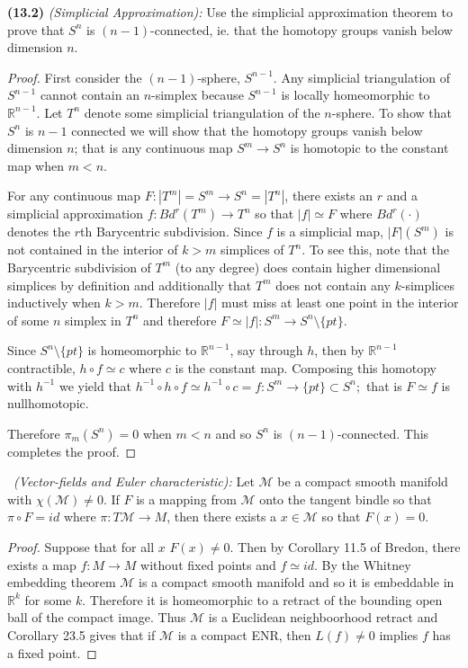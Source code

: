 \documentclass[11pt]{amsart}
\theoremstyle{definition}
\numberwithin{theorem}{section}
\numberwithin{definition}{section}
\numberwithin{equation}{section}
\def\scriptm{{\mathcal M}}
\begin{document}
{\medskip \noindent \textbf{(13.2)} \emph{(Simplicial Approximation):} Use the simplicial approximation theorem to prove that $S^{n}$ is $(n-1)$-connected, ie. that the homotopy groups vanish below dimension $n$.

\begin{proof}
	First consider the $(n-1)$-sphere, $S^{n-1}$. Any simplicial triangulation of $S^{n-1}$ cannot contain an $n$-simplex because $S^{n-1}$ is locally homeomorphic to $\mathbb{R}^{n-1}$. Let $T^{n}$ denote some simplicial triangulation of the $n$-sphere. To show that $S^n$ is $n-1$ connected we will show that the homotopy groups vanish below dimension $n$; that is any continuous map $S^{m} \to S^n$ is homotopic to the constant map when $m < n$. 

	For any continuous map $F: |T^m| = S^m\to S^n = |T^n|$, there exists an $r$ and a simplicial approximation $f: Bd^{r}(T^m) \to T^n$ so that $|f| \simeq F$ where $Bd^r(\cdot)$ denotes the $r$th Barycentric subdivision. Since $f$ is a simplicial map, $|F|(S^m)$ is not contained in the interior of $k > m$ simplices of $T^n$. To see this, note that
	the Barycentric subdivision of $T^m$ (to any degree) does contain higher dimensional simplices by definition and additionally that $T^m$ does not contain any $k$-simplices inductively when $k > m.$ Therefore $|f|$ must miss at least one point in the interior of some $n$ simplex in $T^n$ and therefore $F \simeq |f|:S^m \to S^n \setminus \{pt\}$.

	Since $S^n \setminus \{pt\}$ is homeomorphic to $\mathbb{R}^{n-1}$, say through $h$, then by $\mathbb{R}^{n-1}$ contractible, $h \circ f \simeq c$ where $c$ is the constant map. Composing this homotopy with $h^{-1}$ we yield that $h^{-1} \circ h\circ f \simeq h^{-1} \circ c = f:S^m \to \{pt\} \subset S^n;$ that is $F \simeq f$ is nullhomotopic.

	Therefore $\pi_m(S^n) = 0$ when $m < n$ and so $S^n$ is $(n-1)$-connected. This completes the proof.
\end{proof}



\medskip {}\ \emph{(Vector-fields and Euler characteristic):} Let $\scriptm$ be a compact smooth manifold with $\chi(\scriptm) \neq 0$. If $F$ is a mapping from $\scriptm$ onto the tangent bindle so that $\pi \circ F = id$ where $\pi: T\scriptm \to M$, then there exists a $x \in \scriptm$ so that $F(x) = 0.$ 

\medskip\noindent 
\begin{proof}
  Suppose that for all $x$ $F(x) \neq 0$. Then by Corollary 11.5 of Bredon, there exists a map $f: M \to M$ without fixed points and $f \simeq id$. By the Whitney embedding theorem $\scriptm$ is a compact smooth manifold and so it is embeddable in $\mathbb{R}^k$ for some $k$. Therefore it is homeomorphic to a retract of the bounding open ball of the compact image. Thus $\scriptm$ is a Euclidean neighboorhood retract and Corollary 23.5 gives that if $\scriptm$ is a compact ENR, then  $L(f) \neq 0$ implies $f$ has a fixed point.


\end{proof}}
\end{document}
